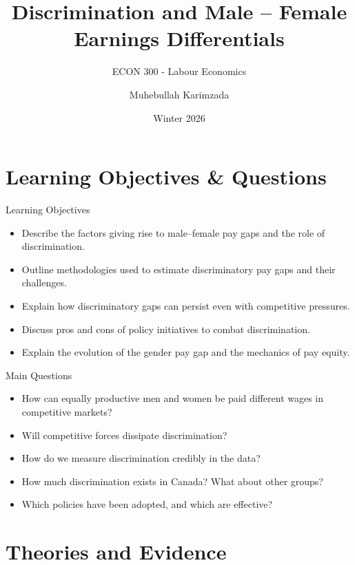 \documentclass[aspectratio=169]{beamer}
\title{\textbf{Discrimination and Male -- Female Earnings Differentials \vspace{.5cm}\\  }}
\subtitle{ {\large ECON 300 - Labour Economics}}
\author{Muhebullah Karimzada}
\date{Winter 2026}
\begin{document}
\begin{frame}[plain]
  \titlepage
\end{frame}

\section{Learning Objectives \& Questions}

\begin{frame}{Learning Objectives}
\transfade
\begin{itemize}[<+->]
  \item Describe the factors giving rise to male--female pay gaps and the role of discrimination.
  \item Outline methodologies used to estimate discriminatory pay gaps and their challenges.
  \item Explain how discriminatory gaps can persist even with competitive pressures.
  \item Discuss pros and cons of policy initiatives to combat discrimination.
  \item Explain the evolution of the gender pay gap and the mechanics of pay equity.
\end{itemize}
\end{frame}

\begin{frame}{Main Questions}
\transfade
\begin{itemize}[<+->]
  \item How can equally productive men and women be paid different wages in competitive markets?
  \item Will competitive forces dissipate discrimination?
  \item How do we measure discrimination credibly in the data?
  \item How much discrimination exists in Canada? What about other groups?
  \item Which policies have been adopted, and which are effective?
\end{itemize}
\end{frame}

\section{Theories and Evidence}
\end{document}
